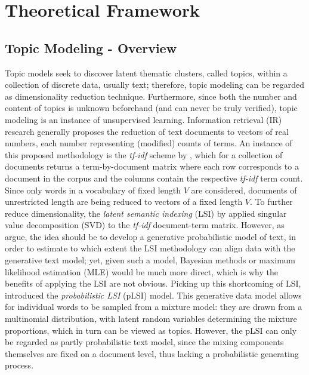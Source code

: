 \section{Theoretical Framework}
\label{Theoretical Framework}

\subsection{Topic Modeling - Overview}
\label{Topic Modeling - Overview}

Topic models seek to discover latent thematic clusters, called topics, within a collection of discrete data, usually text; therefore, topic modeling can be regarded as dimensionality reduction technique. Furthermore, since both the number and content of topics is unknown beforehand (and can never be truly verified), topic modeling is an instance of unsupervised learning. Information retrieval (IR) research generally proposes the reduction of text documents to vectors of real numbers, each number representing (modified) counts of terms. An instance of this proposed methodology is the \textit{tf-idf} scheme by \cite{salton1983information}, which for a collection of documents returns a term-by-document matrix where each row corresponds to a document in the corpus and the columns contain the respective \textit{tf-idf} term count. Since only words in a vocabulary of fixed length $V$ are considered, documents of unrestricted length are being reduced to vectors of a fixed length $V$. To further reduce dimensionality, the \textit{latent semantic indexing} (LSI) by \cite{deerwester1990indexing} applied singular value decomposition (SVD) to the \textit{tf-idf} document-term matrix. However, as \cite{blei2003latent} argue, the idea should be to develop a generative probabilistic model of text, in order to estimate to which extent the LSI methodology can align data with the generative text model; yet, given such a model, Bayesian methods or maximum likelihood estimation (MLE) would be much more direct, which is why the benefits of applying the LSI are not obvious. Picking up this shortcoming of LSI, \cite{hofmann1999probabilistic} introduced the \textit{probabilistic LSI} (pLSI) model. This generative data model allows for individual words to be sampled from a mixture model: they are drawn from a multinomial distribution, with latent random variables determining the mixture proportions, which in turn can be viewed as topics. However, the pLSI can only be regarded as partly probabilistic text model, since the mixing components themselves are fixed on a document level, thus lacking a probabilistic generating process.

